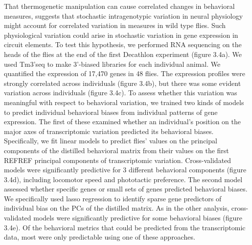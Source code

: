 \documentclass[12pt,letterpaper]{article}
\begin{document}
That thermogenetic manipulation can cause correlated changes in behavioral measures, suggests that stochastic intragenotypic variation in neural physiology might account for correlated variation in measures in wild type flies. Such physiological variation could arise in stochastic variation in gene expression \cite{Lin_Microenvironmental_2016} in circuit elements. To test this hypothesis, we performed RNA sequencing on the heads of the flies at the end of the first Decathlon experiment (figure 3.4a). We used Tm3’seq \cite{Pallares_TM3_2019} to make 3’-biased libraries for each individual animal. We quantified the expression of 17,470 genes in 48 flies. The expression profiles were strongly correlated across individuals (figure 3.4b), but there was some evident variation across individuals (figure 3.4c). To assess whether this variation was meaningful with respect to behavioral variation, we trained two kinds of models to predict individual behavioral biases from individual patterns of gene expression. The first of these examined whether an individual’s position on the major axes of transcriptomic variation predicted its behavioral biases. Specifically, we fit linear models to predict flies’ values on the principal components of the distilled behavioral matrix from their values on the first REFREF principal components of transcriptomic variation. Cross-validated models were significantly predictive for 3 different behavioral components (figure 3.4d), including locomotor speed and phototactic preference. The second model assessed whether specific genes or small sets of genes predicted behavioral biases. We specifically used lasso regression \cite{Santosa_Linear_1986,of_the_B_Regression_1996} to identify sparse gene predictors of individual bias on the PCs of the distilled matrix. As in the other analysis, cross-validated models were significantly predictive for some behavioral biases (figure 3.4e). Of the behavioral metrics that could be predicted from the transcriptomic data, most were only predictable using one of these approaches. 
\end{document}
